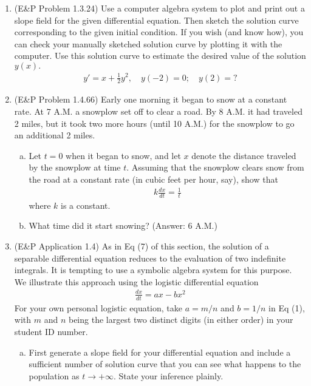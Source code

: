 \documentclass{article}
\begin{document}
\begin{enumerate}
	\item (E\&P Problem 1.3.24) Use a computer algebra system to plot and print out a slope field for the given differential equation. Then sketch the solution curve corresponding to the given initial condition. If you wish (and know how), you can check your manually sketched solution curve by plotting it with the computer. Use this solution curve to estimate the desired value of the solution $y(x).$
		\begin{align*}
			y'=x+\frac{1}{2} y^2, \quad y(-2)=0; \quad y(2)=?
		\end{align*}

	\item (E\&P Problem 1.4.66) Early one morning it began to snow at a constant rate. At 7 A.M. a snowplow set off to clear a road. By 8 A.M. it had traveled 2 miles, but it took two more hours (until 10 A.M.) for the snowplow to go an additional 2 miles.
		\begin{enumerate}[(a)]
			\item Let $t=0$ when it began to snow, and let $x$ denote the distance traveled by the snowplow at time $t.$ Assuming that the snowplow clears snow from the road at a constant rate (in cubic feet per hour, say), show that
				\begin{align*}
					k\frac{dx}{dt} = \frac{1}{t}
				\end{align*}
				where $k$ is a constant.

			\item What time did it start snowing? (Answer: 6 A.M.)
				
		\end{enumerate}

	\item (E\&P Application 1.4) As in Eq (7) of this section, the solution of a separable differential equation reduces to the evaluation of two indefinite integrals. It is tempting to use a symbolic algebra system for this purpose. We illustrate this approach using the logistic differential equation
		\begin{align*}
			\frac{dx}{dt} = ax-bx^2 \tag{1}
		\end{align*}
		For your own personal logistic equation, take $a=m/n$ and $b=1/n$ in Eq (1), with $m$ and $n$ being the largest two distinct digits (in either order) in your student ID number.
		\begin{enumerate}[(a)]
			\item First generate a slope field for your differential equation and include a sufficient number of solution curve that you can see what happens to the population as $t\to+\infty.$ State your inference plainly.


\end{enumerate}
\end{enumerate}
\end{document}

